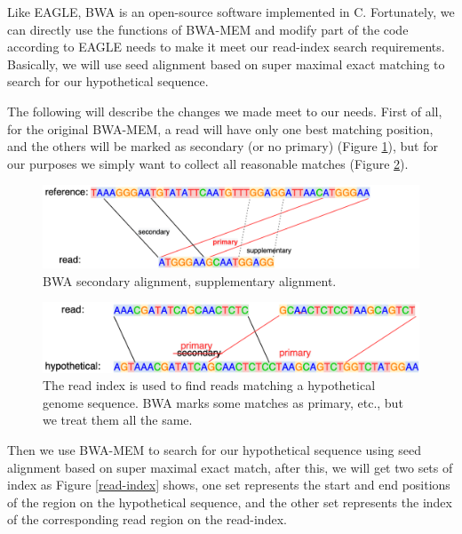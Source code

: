 Like EAGLE, BWA is an open-source software implemented in C.  Fortunately, we can directly use the functions of BWA-MEM and modify part of the code according to EAGLE needs to make it meet our read-index search requirements. Basically, we will use seed alignment based on super maximal exact matching to search for our hypothetical sequence.

The following will describe the changes we made meet to our needs. First of all, for the original BWA-MEM, a read will have only one best matching position, and the others will be marked as secondary (or no primary) (Figure \ref{secondary-alignment}), but for our purposes we simply want to collect all reasonable matches (Figure \ref{primary-alignment}).

\begin{figure}[H]
\vspace{1em}
\includegraphics[width=1\columnwidth]{body/image/secondary-alignment.png}
\caption[secondary alignment]{BWA secondary alignment, supplementary alignment.}
\label{secondary-alignment}
\end{figure}

\begin{figure}[H]
\includegraphics[width=1\columnwidth]{body/image/primary-alignment.png}
\caption[primary alignment]{The read index is used to find reads matching a hypothetical genome sequence.  BWA marks some matches as primary, etc., but we treat them all the same.}
\label{primary-alignment}
\end{figure}

Then we use BWA-MEM to search for our hypothetical sequence using seed alignment based on super maximal exact match, after this, we will get two sets of index as Figure \ref{read-index} shows, one set represents the start and end positions of the region on the hypothetical sequence, and the other set represents the index of the corresponding read region on the read-index. 

